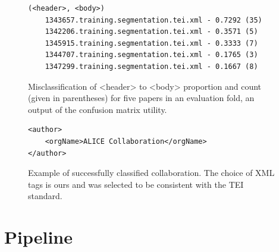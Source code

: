 \begin{figure}[b]
\centering
\begin{BVerbatim}
(<header>, <body>)
	1343657.training.segmentation.tei.xml - 0.7292 (35)
	1342206.training.segmentation.tei.xml - 0.3571 (5)
	1345915.training.segmentation.tei.xml - 0.3333 (7)
	1344707.training.segmentation.tei.xml - 0.1765 (3)
	1347299.training.segmentation.tei.xml - 0.1667 (8)
\end{BVerbatim}
\caption{Misclassification of <header> to <body> proportion and count (given in parentheses) for five papers in an evaluation fold, an output of the confusion matrix utility.}
\label{fig:topk}
\end{figure}

\begin{figure}[b]
\lstset{language=XML}
\begin{lstlisting}
<author>
    <orgName>ALICE Collaboration</orgName>
</author>
\end{lstlisting}
\caption{Example of successfully classified collaboration. The choice of XML tags is ours and was selected to be consistent with the TEI standard.}
\label{fig:collaboration}
\end{figure}

\section{Pipeline}
\label{sec:pipeline}


